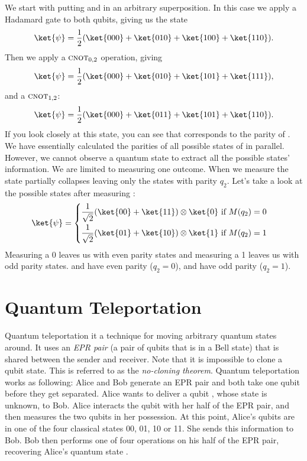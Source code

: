 We start with putting  and  in an arbitrary superposition. In this case we apply a Hadamard gate to both qubits, giving us the state
\begin{equation}
  \ket{\psi} = \dfrac{1}{2}(\ket{000} + \ket{010} + \ket{100} + \ket{110}).
\end{equation}
Then we apply a $\textsc{cnot}_{0,2}$ operation, giving
\begin{equation}
  \ket{\psi} = \dfrac{1}{2}(\ket{000} + \ket{010} + \ket{101} + \ket{111}),
\end{equation}
and a $\textsc{cnot}_{1,2}$:
\begin{equation}
  \ket{\psi} = \dfrac{1}{2}(\ket{000} + \ket{011} + \ket{101} + \ket{110}).
\end{equation}
If you look closely at this state, you can see that  corresponds to the parity of . We have essentially calculated the parities of all possible states of  in parallel. However, we cannot observe a quantum state to extract all the possible states' information. We are limited to measuring one outcome. When we measure  the state partially collapses leaving only the states with parity $q_2$. Let's take a look at the possible states after measuring :
\begin{equation}
  \ket{\psi} =
  \begin{cases}
    \begin{aligned}
      \dfrac{1}{\sqrt2}(\ket{00} + \ket{11}) \otimes \ket{0} & \text{ if } M(q_2) = 0 \\
      \dfrac{1}{\sqrt2}(\ket{01} + \ket{10}) \otimes \ket{1} & \text{ if } M(q_2) = 1
    \end{aligned}
  \end{cases}
\end{equation}
Measuring a 0 leaves us with even parity states and measuring a 1 leaves us with odd parity states.  and  have even parity ($q_2 = 0$),  and  have odd parity ($q_2 = 1$).

\section{Quantum Teleportation}
Quantum teleportation it a technique for moving arbitrary quantum states around. It uses an \emph{EPR pair} (a pair of qubits that is in a Bell state) that is shared between the sender and receiver. Note that it is impossible to clone a qubit state. This is referred to as the \emph{no-cloning theorem}. Quantum teleportation works as following: Alice and Bob generate an EPR pair and both take one qubit before they get separated. Alice wants to deliver a qubit \ket{\phi}, whose state is unknown, to Bob. Alice interacts the qubit \ket{\phi} with her half of the EPR pair, and then measures the two qubits in her possession. At this point, Alice's qubits are in one of the four classical states 00, 01, 10 or 11. She sends this information to Bob. Bob then performs one of four operations on his half of the EPR pair, recovering Alice's quantum state \ket{\phi}.

